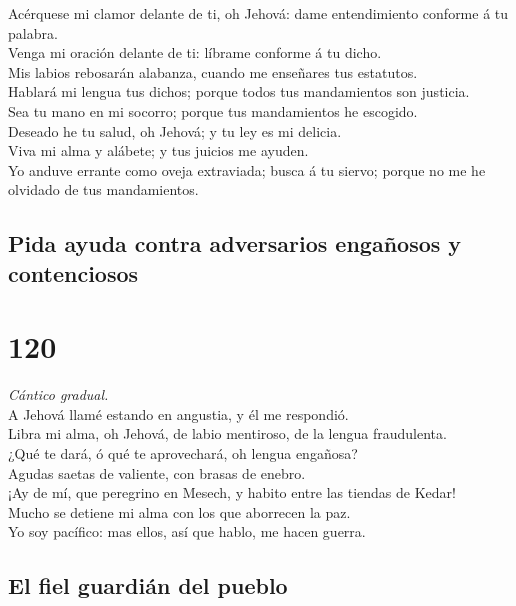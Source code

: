  Acérquese mi clamor delante de ti, oh Jehová: dame
entendimiento conforme á tu palabra.\\
 Venga mi oración delante de ti: líbrame conforme á tu
dicho.\\
 Mis labios rebosarán alabanza, cuando me enseñares tus
estatutos.\\
 Hablará mi lengua tus dichos; porque todos tus
mandamientos son justicia.\\
 Sea tu mano en mi socorro; porque tus mandamientos he
escogido.\\
 Deseado he tu salud, oh Jehová; y tu ley es mi delicia.\\
 Viva mi alma y alábete; y tus juicios me ayuden.\\
 Yo anduve errante como oveja extraviada; busca á tu
siervo; porque no me he olvidado de tus mandamientos.

\hypertarget{pida-ayuda-contra-adversarios-engauxf1osos-y-contenciosos}{%
\subsection{Pida ayuda contra adversarios engañosos y
contenciosos}\label{pida-ayuda-contra-adversarios-engauxf1osos-y-contenciosos}}

\hypertarget{section-119}{%
\section{120}\label{section-119}}

 \emph{Cántico gradual.}\\
A Jehová llamé estando en angustia, y él me respondió.\\
 Libra mi alma, oh Jehová, de labio mentiroso, de la lengua
fraudulenta.\\
 ¿Qué te dará, ó qué te aprovechará, oh lengua engañosa?\\
 Agudas saetas de valiente, con brasas de enebro.\\
 ¡Ay de mí, que peregrino en Mesech, y habito entre las
tiendas de Kedar!\\
 Mucho se detiene mi alma con los que aborrecen la paz.\\
 Yo soy pacífico: mas ellos, así que hablo, me hacen guerra.

\hypertarget{el-fiel-guardiuxe1n-del-pueblo}{%
\subsection{El fiel guardián del
pueblo}\label{el-fiel-guardiuxe1n-del-pueblo}}

